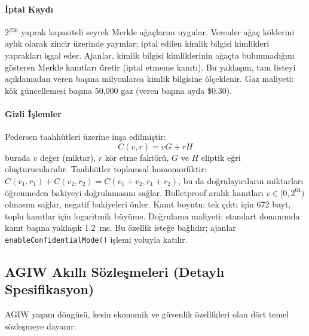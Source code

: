 \documentclass[11pt]{article}
\begin{document}
\paragraph{İptal Kaydı} 2$^{256}$ yaprak kapasiteli seyrek Merkle ağaçlarını uygular. Verenler ağaç köklerini aylık olarak zincir üzerinde yayınlar; iptal edilen kimlik bilgisi kimlikleri yaprakları işgal eder. Ajanlar, kimlik bilgisi kimliklerinin ağaçta bulunmadığını gösteren Merkle kanıtları üretir (iptal etmeme kanıtı). Bu yaklaşım, tam listeyi açıklamadan veren başına milyonlarca kimlik bilgisine ölçeklenir. Gaz maliyeti: kök güncellemesi başına 50,000 gaz (veren başına ayda \$0.30).

\paragraph{Gizli İşlemler} Pedersen taahhütleri üzerine inşa edilmiştir:
\begin{equation}
C(v, r) = vG + rH
\end{equation}
burada $v$ değer (miktar), $r$ kör etme faktörü, $G$ ve $H$ eliptik eğri oluşturucularıdır. Taahhütler toplamsal homomorfiktir: $C(v_1, r_1) + C(v_2, r_2) = C(v_1 + v_2, r_1 + r_2)$, bu da doğrulayıcıların miktarları öğrenmeden bakiyeyi doğrulamasını sağlar. Bulletproof aralık kanıtları $v \in [0, 2^{64})$ olmasını sağlar, negatif bakiyeleri önler. Kanıt boyutu: tek çıktı için 672 bayt, toplu kanıtlar için logaritmik büyüme. Doğrulama maliyeti: standart donanımda kanıt başına yaklaşık 1.2~ms. Bu özellik isteğe bağlıdır; ajanlar \texttt{enableConfidentialMode()} işlemi yoluyla katılır.

\subsection{AGIW Akıllı Sözleşmeleri (Detaylı Spesifikasyon)}
\label{sec:agiw-contracts}
AGIW yaşam döngüsü, kesin ekonomik ve güvenlik özellikleri olan dört temel sözleşmeye dayanır:
\end{document}
